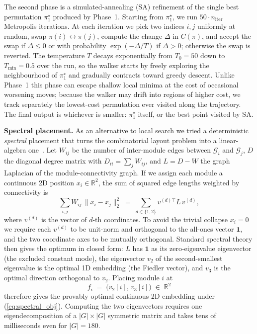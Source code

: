 The second phase is a simulated-annealing (SA) refinement of the single best permutation $\pi^\star_1$ produced by Phase~1. Starting from $\pi^\star_1$, we run $50 \cdot n_\mathrm{iter}$ Metropolis iterations. At each iteration we pick two indices $i,j$ uniformly at random, swap $\pi(i)\leftrightarrow\pi(j)$, compute the change $\Delta$ in $C(\pi)$, and accept the swap if $\Delta \le 0$ or with probability $\exp(-\Delta/T)$ if $\Delta>0$; otherwise the swap is reverted. The temperature $T$ decays exponentially from $T_0 = 50$ down to $T_{\min} = 0.5$ over the run, so the walker starts by freely exploring the neighbourhood of $\pi^\star_1$ and gradually contracts toward greedy descent. Unlike Phase~1 this phase can escape shallow local minima at the cost of occasional worsening moves; because the walker may drift into regions of higher cost, we track separately the lowest-cost permutation ever visited along the trajectory. The final output is whichever is smaller: $\pi^\star_1$ itself, or the best point visited by SA.

\smallskip
\noindent\textbf{Spectral placement.}
As an alternative to local search we tried a deterministic \emph{spectral} placement that turns the combinatorial layout problem into a linear-algebra one~\cite{spectral_layout}. Let $W_{ij}$ be the number of inter-module edges between $\mathcal{G}_i$ and $\mathcal{G}_j$, $D$ the diagonal degree matrix with $D_{ii}=\sum_j W_{ij}$, and $L = D - W$ the graph Laplacian of the module-connectivity graph. If we assign each module a continuous 2D position $x_i \in \mathbb{R}^2$, the sum of squared edge lengths weighted by connectivity is
\begin{equation}
    \sum_{i,j} W_{ij}\,\lVert x_i - x_j\rVert_2^2 \;=\; \sum_{d\in\{1,2\}} v^{(d)\top} L\, v^{(d)},
    \label{eq:spectral_obj}
\end{equation}
where $v^{(d)}$ is the vector of $d$-th coordinates. To avoid the trivial collapse $x_i = 0$ we require each $v^{(d)}$ to be unit-norm and orthogonal to the all-ones vector $\mathbf{1}$, and the two coordinate axes to be mutually orthogonal. Standard spectral theory then gives the optimum in closed form: $L$ has $\mathbf{1}$ as its zero-eigenvalue eigenvector (the excluded constant mode), the eigenvector $v_2$ of the second-smallest eigenvalue is the optimal 1D embedding (the Fiedler vector), and $v_3$ is the optimal direction orthogonal to $v_2$. Placing module $i$ at
\begin{equation}
    f_i \;=\; \bigl(v_2[i],\, v_3[i]\bigr)\;\in\;\mathbb{R}^2
    \label{eq:spectral_coord}
\end{equation}
therefore gives the provably optimal continuous 2D embedding under (\ref{eq:spectral_obj}). Computing the two eigenvectors requires one eigendecomposition of a $|G|\times|G|$ symmetric matrix and takes tens of milliseconds even for $|G|=180$.

